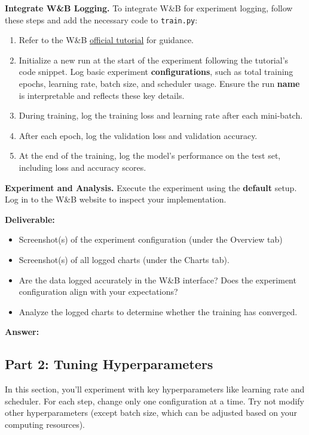 \documentclass[11pt, oneside]{article}   	%
\begin{document}
\noindent \textbf{Integrate W\&B Logging.}
To integrate W\&B for experiment logging, follow these steps and add the necessary code to \texttt{train.py}:
\begin{enumerate}
    \item Refer to the W\&B \href{https://docs.wandb.ai/tutorials/experiments}{official tutorial} for guidance.
    \item Initialize a new run at the start of the experiment following the tutorial's code snippet. Log basic experiment \textbf{configurations}, such as total training epochs, learning rate, batch size, and scheduler usage. Ensure the run \textbf{name} is interpretable and reflects these key details.
    \item During training, log the training loss and learning rate after each mini-batch.
    \item After each epoch, log the validation loss and validation accuracy.
    \item At the end of the training, log the model's performance on the test set, including loss and accuracy scores.
\end{enumerate}

\noindent \textbf{Experiment and Analysis. }
Execute the experiment using the \textbf{default} setup. Log in to the W\&B website to inspect your implementation. 

\noindent\textbf{Deliverable:}
\begin{itemize}
    \item Screenshot(s) of the experiment configuration (under the Overview tab)
    \item Screenshot(s) of all logged charts (under the Charts tab).
    \item Are the data logged accurately in the W\&B interface? Does the experiment configuration align with your expectations?
    \item Analyze the logged charts to determine whether the training has converged.
\end{itemize}


\textbf{Answer:} \\


\subsection*{Part 2: Tuning Hyperparameters}
In this section, you'll experiment with key hyperparameters like learning rate and scheduler. For each step, change only one configuration at a time. Try not modify other hyperparameters (except batch size, which can be adjusted based on your computing resources).
\end{document}
